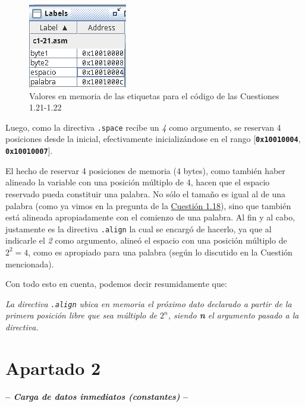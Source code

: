 \documentclass[a4paper]{report}
\begin{document}
\begin{figure}[h]
    \centering
    \captionsetup{justification = centering}
    \includegraphics[width=.25\linewidth]{img/c1-21}
    \caption{Valores en memoria de las etiquetas para el código de las Cuestiones 1.21-1.22}
    \label{fig:c1-21-labels}
\end{figure}

Luego, como la directiva \texttt{.space} recibe un \textit{4} como argumento, se reservan 4 posiciones desde la inicial, efectivamente inicializándose en el rango [\texttt{\textbf{0x10010004}}, \texttt{\textbf{0x10010007}}].

El hecho de reservar 4 posiciones de memoria (4 bytes), como también haber alineado la variable con una posición múltiplo de 4, hacen que el espacio reservado pueda constituir una palabra. No sólo el tamaño es igual al de una palabra (como ya vimos en la pregunta de la \hyperref[sec:c1-18]{Cuestión 1.18}), sino que también está alineada apropiadamente con el comienzo de una palabra. Al fin y al cabo, justamente es la directiva \texttt{.align} la cual se encargó de hacerlo, ya que al indicarle el \textit{2} como argumento, alineó el espacio con una posición múltiplo de $2^2 = 4$, como es apropiado para una palabra (según lo discutido en la Cuestión mencionada).

Con todo esto en cuenta, podemos decir resumidamente que:

\begin{center}
    \textit{La directiva \texttt{.align} ubica en memoria el próximo dato declarado a partir de la primera posición libre que sea múltiplo de $2^n$, siendo \textbf{n} el argumento pasado a la directiva.}
\end{center}

\section{Apartado 2}

\begin{center}
\large\textbf{-- \textsl{Carga de datos inmediatos (constantes)} --}
\end{center}
\end{document}
